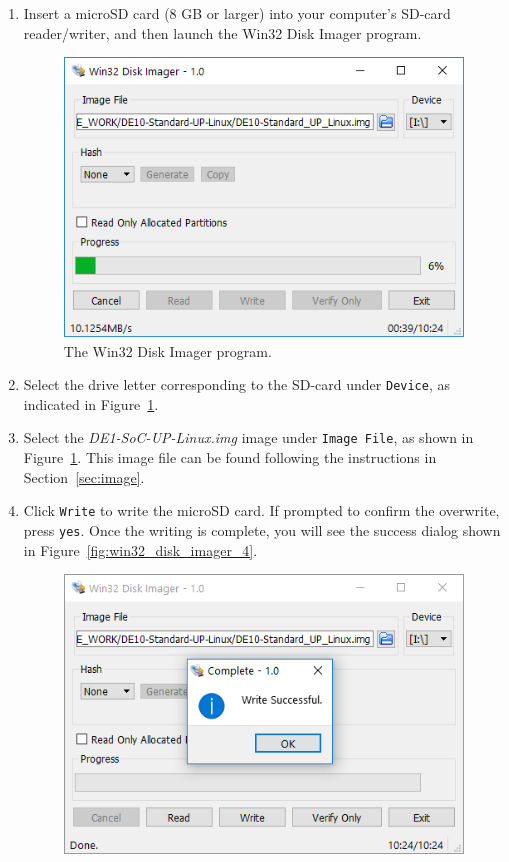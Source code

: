\documentclass[11pt, twoside, pdftex]{article}
\begin{document}
\begin{enumerate}

\item Insert a microSD card (8 GB or larger) into your computer's SD-card reader/writer,
and then launch the Win32 Disk Imager program.
\begin{figure} [h]
\begin{center}
\includegraphics[scale = 0.7]{figures/Win32DiskImager1.png}
\end{center}
\caption{The Win32 Disk Imager program.}
\label{fig:win32_disk_imager}
\end{figure}
\item Select the drive letter corresponding to the SD-card under \texttt{Device}, 
as indicated in Figure~\ref{fig:win32_disk_imager}.
\item Select the \textit{DE1-SoC-UP-Linux.img} image under \texttt{Image File}, as shown in 
Figure~\ref{fig:win32_disk_imager}. This image file can be found following the
instructions in Section~\ref{sec:image}.
\item Click \texttt{Write} to write the microSD card. If prompted to confirm the overwrite, 
press \texttt{yes}. Once the writing is complete, you will see the success dialog shown in 
Figure~\ref{fig:win32_disk_imager_4}.
\begin{figure} [h]
\begin{center}
\includegraphics[scale = 0.7]{figures/Win32DiskImager4.png}

\end{center}
\end{figure}
\end{enumerate}
\end{document}
